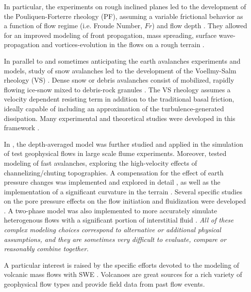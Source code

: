 \documentclass{article}
\begin{document}
In particular, the experiments on rough inclined planes led to the development of the Pouliquen-Forterre rheology (PF), assuming a variable frictional behavior as a function of flow regime (i.e. Froude Number, $Fr$) and flow depth \citep{Pouliquen1999, ForterrePouliquen2002, PouliquenForterre2002, ForterrePouliquen2003}. They allowed for an improved modeling of front propagation, mass spreading, surface wave-propagation and vortices-evolution in the flows on a rough terrain \citep{Forterre2006, Jop2006, ForterrePouliquen2008}.

In parallel to and sometimes anticipating the earth avalanches experiments and models, study of snow avalanches led to the development of the Voellmy-Salm rheology (VS) \citep{Voellmy1955, Salm1990, Salm1993, Bartelt1999}. Dense snow or debris avalanches consist of mobilized, rapidly flowing ice-snow mixed to debris-rock granules \citep{BarteltMcArdell2009}. The VS rheology assumes a velocity dependent resisting term in addition to the traditional basal friction, ideally capable of including an approximation of the turbulence-generated dissipation. Many experimental and theoretical studies were developed in this framework \citep{Gruber2007, Kern2009, Christen2010, Fischer2012}.

In \cite{Iverson1997, Iverson2001, Denlinger2001, Denlinger2004, Iverson2004}, the depth-averaged model was further studied and applied in the simulation of test geophysical flows in large scale flume experiments. Moreover, \cite{Gray1999, Gray2003} tested modeling of fast avalanches, exploring the high-velocity effects of channelizing/chuting topographies. A compensation for the effect of earth pressure changes was implemented and explored in detail \citep{Pirulli2007,Pirulli2008}, as well as the implementation of a significant curvature in the terrain \citep{PudasainiHutter2003, Fischer2012}. Several specific studies on the pore pressure effects on the flow initiation and fluidization were developed \citep{SavageIverson2003, Iordanoff2004, Iverson2014}. A two-phase model was also implemented to more accurately simulate heterogenous flows with a significant portion of interstitial fluid \citep{PitmanLe2005}. {\it All of these complex modeling choices correspond to alternative or additional physical assumptions, and they are sometimes very difficult to evaluate, compare or reasonably combine together.}

A particular interest is raised by the specific efforts devoted to the modeling of volcanic mass flows with SWE \citep{FreundtBursik1998,Pitman2003a,Bursik2005,Saucedo2005, Kelfoun2005,Charbonnier2009,Kelfoun2009,Procter2010,Sulpizio2010,Kelfoun2011,Charbonnier2013}. Volcanoes are great sources for a rich variety of geophysical flow types and provide field data from past flow events.
\end{document}
